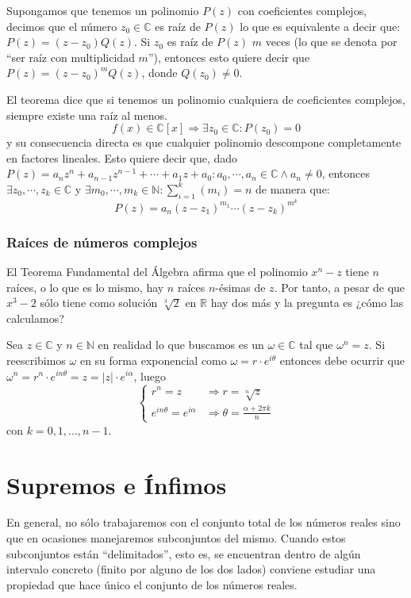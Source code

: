 \documentclass[10pt,a4paper,openright]{book}
\theoremstyle{break}
\begin{document}
Supongamos que tenemos un polinomio $P(z)$ con coeficientes complejos, decimos que el número $z_0\in \mathbb C$ es raíz de $P(z)$ lo que es equivalente a decir que: $P(z)=(z-z_0)Q(z)$. Si $z_0$ es raíz de $P(z)$ $m$ veces (lo que se denota por ``ser raíz con multiplicidad $m$''), entonces esto quiere decir que $P(z)=(z-z_0)^mQ(z)$, donde $Q(z_0)\neq 0$.

El teorema dice que si tenemos un polinomio cualquiera de coeficientes complejos, siempre existe una raíz al menos.
$$f(x)\in \mathbb C[x]\Rightarrow \exists z_0\in \mathbb C: P(z_0)=0$$
y su consecuencia directa es que cualquier polinomio descompone completamente en factores lineales. Esto quiere decir que, dado $P(z)=a_nz^n+a_{n-1}z^{n-1}+\cdots + a_1z+a_0: a_0,\cdots, a_n\in \mathbb C \wedge a_n\neq 0$, entonces $\exists z_0,\cdots, z_k\in \mathbb C$ y $\exists m_0,\cdots, m_k\in \mathbb N : \sum_{i=1}^k(m_i)=n$ de manera que:
$$P(z)=a_n(z-z_1)^{m_1}\cdots (z-z_k)^{m^k}$$

\subsubsection{Raíces de números complejos}
El Teorema Fundamental del Álgebra afirma que el polinomio $x^n - z$ tiene $n$ raíces, o lo que es lo mismo, hay $n$ raíces $n$-ésimas de $z$. Por tanto, a pesar de que $x^3-2$ sólo tiene como solución $\sqrt[3]{2}$ en $\mathbb R$ hay dos más y la pregunta es ¿cómo las calculamos?

Sea $z\in \mathbb C$ y $n\in \mathbb N$ en realidad lo que buscamos es un $\omega \in \mathbb C$ tal que $\omega^n=z$. Si reescribimos $\omega$ en su forma exponencial como $\omega=r\cdot e^{i\theta}$ entonces debe ocurrir que $\omega^n=r^n\cdot e^{in\theta}=z=|z|\cdot e^{i\alpha}$, luego 
\[
\begin{cases}
r^n=z & \Rightarrow r=\sqrt[n]{z} \\
e^{in\theta}=e^{i\alpha} & \Rightarrow \theta=\frac{\alpha+2\pi k}{n}
\end{cases}
\]
con $k=0,1,..., n-1$.

\section{Supremos e Ínfimos}
En general, no sólo trabajaremos con el conjunto total de los números reales sino que en ocasiones manejaremos subconjuntos del mismo. Cuando estos subconjuntos están ``delimitados'', esto es, se encuentran dentro de algún intervalo concreto (finito por alguno de los dos lados) conviene estudiar una propiedad que hace único el conjunto de los números reales.
\end{document}
